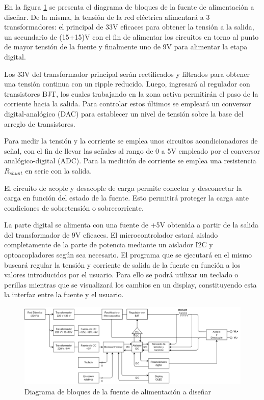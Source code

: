 En la figura \ref{F:Diagrama_Bloques_general} se presenta el diagrama de bloques de la fuente de alimentación a diseñar. De la misma, la tensión de la red eléctrica alimentará a 3 transformadores: el principal de 33V eficaces para obtener la tensión a la salida, un secundario de (15+15)V con el fin de alimentar los circuitos en torno al punto de mayor tensión de la fuente y finalmente uno de 9V para alimentar la etapa digital.\par 
Los 33V del transformador principal serán rectificados y filtrados para obtener una tensión continua con un ripple reducido. Luego, ingresará al regulador con transistores BJT, los cuales trabajando en la zona activa permitirán el paso de la corriente hacia la salida. Para controlar estos últimos se empleará un conversor digital-analógico (DAC) para establecer un nivel de tensión sobre la base del arreglo de transistores. \par 
Para medir la tensión y la corriente se emplea unos circuitos acondicionadores de señal, con el fin de llevar las señales al rango de 0 a 5V empleado por el conversor analógico-digital (ADC). Para la medición de corriente se emplea una resistencia $R_{shunt}$ en serie con la salida. \par 
El circuito de acople y desacople de carga permite conectar y desconectar la carga en función del estado de la fuente. Esto permitirá proteger la carga ante condiciones de sobretensión o sobrecorriente.\par 
La parte digital se alimenta con una fuente de +5V obtenida a partir de la salida del transformador de 9V eficaces. El microcontrolador estará aislado completamente de la parte de potencia mediante un aislador I2C y optoacopladores según sea necesario. El programa que se ejecutará en el mismo buscará regular la tensión y corriente de salida de la fuente en función a los valores introducidos por el usuario. Para ello se podrá utilizar un teclado o perillas mientras que se visualizará los cambios en un display, constituyendo esta la interfaz entre la fuente y el usuario.

\begin{figure}[H]
    \centering
    \includegraphics[width=\textwidth]{./imagenes/Diagrama_Bloques_general.jpg}
    \caption{Diagrama de bloques de la fuente de alimentación a diseñar}
    \label{F:Diagrama_Bloques_general}
\end{figure}


